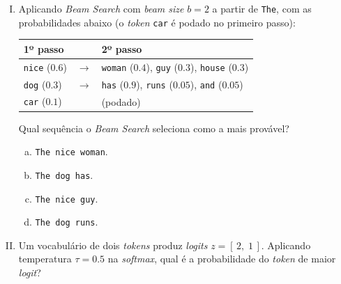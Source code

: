 \documentclass{dlproblemset}
\begin{document}
\begin{enumerate}[I)]
\begin{enumerate}[a)]
    \item $2$.
    \item $\approx -1.386$.
    \item $0.25$.
    \item $\approx 1.386$.
\end{enumerate}

\item Aplicando \textit{Beam Search} com \textit{beam size} $b = 2$ a partir de \texttt{The}, com
as probabilidades abaixo (o \textit{token} \texttt{car} é podado no primeiro passo):

\begin{center}
\begin{tabular}{lcl}
    \toprule
    1º passo & & 2º passo \\
    \midrule
    \texttt{nice} \;($0.6$) & $\rightarrow$ & \texttt{woman} ($0.4$), \texttt{guy} ($0.3$), \texttt{house} ($0.3$) \\
    \texttt{dog} \;\;($0.3$) & $\rightarrow$ & \texttt{has} ($0.9$), \texttt{runs} ($0.05$), \texttt{and} ($0.05$) \\
    \texttt{car} \;\;($0.1$) & & (podado) \\
    \bottomrule
\end{tabular}
\end{center}

Qual sequência o \textit{Beam Search} seleciona como a mais provável?

\begin{enumerate}[a)]
    \item \texttt{The nice woman}.
    \item \texttt{The dog has}.
    \item \texttt{The nice guy}.
    \item \texttt{The dog runs}.
\end{enumerate}

\item Um vocabulário de dois \textit{tokens} produz \textit{logits} $z = [\,2,\; 1\,]$. Aplicando
temperatura $\tau = 0.5$ na \textit{softmax}, qual é a probabilidade do \textit{token} de maior
\textit{logit}?


\end{enumerate}
\end{document}

